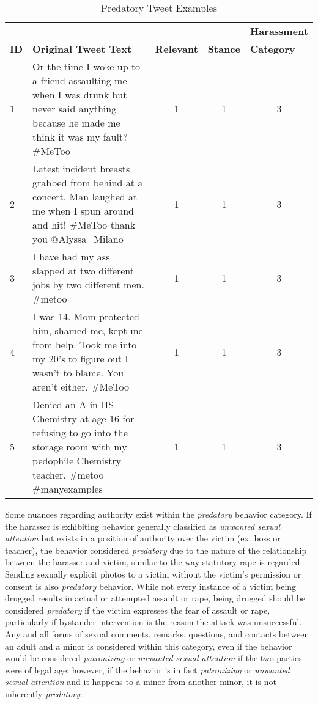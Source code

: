 \begin{table}[H]
    \centering
    \caption{Predatory Tweet Examples}
    \begin{tabular}{m{1cm} m{8cm} m{1.5cm} m{1.1cm} m{2.1cm}}
        \toprule
        & {} & {} & {} & {\textbf{Harassment}} \\
        \rowcolor{White}\textbf{ID} & {\textbf{Original Tweet Text}} & {\textbf{Relevant}} & {\textbf{Stance}} & {\textbf{Category}} \\
                \midrule
        1 & Or the time I woke up to a friend assaulting me when I was drunk but never said anything because he made me think it was my fault? \#MeToo & \multicolumn{1}{c}{1} & \multicolumn{1}{c}{1} & \multicolumn{1}{c}{3}\\
        2 & Latest incident breasts grabbed from behind at a concert. Man laughed at me when I spun around and hit! \#MeToo thank you @Alyssa\_Milano & \multicolumn{1}{c}{1} & \multicolumn{1}{c}{1} & \multicolumn{1}{c}{3}\\
        3 & I have had my ass slapped at two different jobs by two different men. \#metoo & \multicolumn{1}{c}{1} & \multicolumn{1}{c}{1} & \multicolumn{1}{c}{3}\\
        4 & I was 14. Mom protected him, shamed me, kept me from help. Took me into my 20's to figure out I wasn't to blame. You aren't either. \#MeToo & \multicolumn{1}{c}{1} & \multicolumn{1}{c}{1} & \multicolumn{1}{c}{3}\\
        5 & Denied an A in HS Chemistry at age 16 for refusing to go into the storage room with my pedophile Chemistry teacher. \#metoo \#manyexamples & \multicolumn{1}{c}{1} & \multicolumn{1}{c}{1} & \multicolumn{1}{c}{3}\\

        \bottomrule
    \end{tabular}
\end{table}

Some nuances regarding authority exist within the  \textit{predatory} behavior category. If the harasser is exhibiting behavior generally classified as  \textit{unwanted sexual attention} but exists in a position of authority over the victim (ex. boss or teacher), the behavior considered  \textit{predatory} due to the nature of the relationship between the harasser and victim, similar to the way statutory rape is regarded. Sending sexually explicit photos to a victim without the victim's permission or consent is also  \textit{predatory} behavior. While not every instance of a victim being drugged results in actual or attempted assault or rape, being drugged should be considered  \textit{predatory} if the victim expresses the fear of assault or rape, particularly if bystander intervention is the reason the attack was unsuccessful. Any and all forms of sexual comments, remarks, questions, and contacts between an adult and a minor is considered within this category, even if the behavior would be considered  \textit{patronizing} or  \textit{unwanted sexual attention} if the two parties were of legal age; however, if the behavior is in fact \textit{patronizing} or  \textit{unwanted sexual attention} and it happens to a minor from another minor, it is not inherently  \textit{predatory}.

